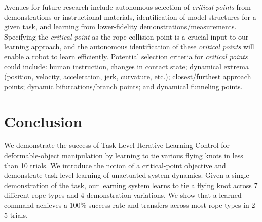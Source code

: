 \documentclass[conference]{IEEEtran}
\begin{document}

Avenues for future research include autonomous selection of \textit{critical points} from demonstrations or instructional materials, identification of model structures for a given task, and learning from lower-fidelity demonstrations/measurements. Specifying the \textit{critical point} as the rope collision point is a crucial input to our learning approach, and the autonomous identification of these \textit{critical points} will enable a robot to learn efficiently. Potential selection criteria for \textit{critical points} could include: human instruction, changes in contact state; dynamical extrema (position, velocity, acceleration, jerk, curvature, etc.); closest/furthest approach points; dynamic bifurcations/branch points; and dynamical funneling points.   


\section{Conclusion} 
\label{sec:conclusion}
We demonstrate the success of Task-Level Iterative Learning Control for deformable-object manipulation by learning to tie various flying knots in less than 10 trials. We introduce the notion of a critical-point objective and demonstrate task-level learning of unactuated system dynamics. Given a single demonstration of the task, our learning system learns to tie a flying knot across 7 different rope types and 4 demonstration variations. We show that a learned command achieves a 100\% success rate and transfers across most rope types in 2-5 trials. 





\clearpage
\appendix
\end{document}
